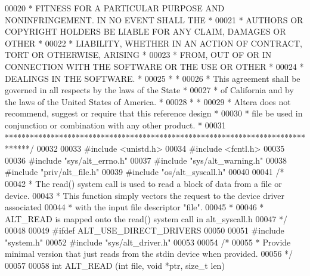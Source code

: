 \begin{DoxyCode}
00020 \textcolor{comment}{* FITNESS FOR A PARTICULAR PURPOSE AND NONINFRINGEMENT. IN NO EVENT SHALL THE *}
00021 \textcolor{comment}{* AUTHORS OR COPYRIGHT HOLDERS BE LIABLE FOR ANY CLAIM, DAMAGES OR OTHER      *}
00022 \textcolor{comment}{* LIABILITY, WHETHER IN AN ACTION OF CONTRACT, TORT OR OTHERWISE, ARISING     *}
00023 \textcolor{comment}{* FROM, OUT OF OR IN CONNECTION WITH THE SOFTWARE OR THE USE OR OTHER         *}
00024 \textcolor{comment}{* DEALINGS IN THE SOFTWARE.                                                   *}
00025 \textcolor{comment}{*                                                                             *}
00026 \textcolor{comment}{* This agreement shall be governed in all respects by the laws of the State   *}
00027 \textcolor{comment}{* of California and by the laws of the United States of America.              *}
00028 \textcolor{comment}{*                                                                             *}
00029 \textcolor{comment}{* Altera does not recommend, suggest or require that this reference design    *}
00030 \textcolor{comment}{* file be used in conjunction or combination with any other product.          *}
00031 \textcolor{comment}{******************************************************************************/}
00032 
00033 \textcolor{preprocessor}{#include <unistd.h>}
00034 \textcolor{preprocessor}{#include <fcntl.h>}
00035 
00036 \textcolor{preprocessor}{#include "sys/alt_errno.h"}
00037 \textcolor{preprocessor}{#include "sys/alt_warning.h"}
00038 \textcolor{preprocessor}{#include "priv/alt_file.h"}
00039 \textcolor{preprocessor}{#include "os/alt_syscall.h"}
00040 
00041 \textcolor{comment}{/*}
00042 \textcolor{comment}{ * The read() system call is used to read a block of data from a file or device.}
00043 \textcolor{comment}{ * This function simply vectors the request to the device driver associated}
00044 \textcolor{comment}{ * with the input file descriptor "file". }
00045 \textcolor{comment}{ *}
00046 \textcolor{comment}{ * ALT\_READ is mapped onto the read() system call in alt\_syscall.h}
00047 \textcolor{comment}{ */}
00048 
00049 \textcolor{preprocessor}{#ifdef ALT\_USE\_DIRECT\_DRIVERS}
00050 
00051 \textcolor{preprocessor}{#include "system.h"}
00052 \textcolor{preprocessor}{#include "sys/alt_driver.h"}
00053 
00054 \textcolor{comment}{/*}
00055 \textcolor{comment}{ * Provide minimal version that just reads from the stdin device when provided.}
00056 \textcolor{comment}{ */}
00057 
00058 \textcolor{keywordtype}{int} ALT_READ (\textcolor{keywordtype}{int} file, \textcolor{keywordtype}{void} *ptr, \textcolor{keywordtype}{size\_t} len)

\end{DoxyCode}
